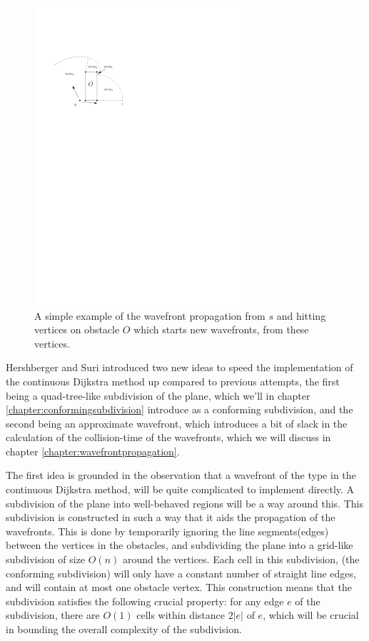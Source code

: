 \begin{figure}[H]
    \centering
	\includegraphics[width=0.7\textwidth]{figures/introductiontowavefront.pdf}
	\caption{A simple example of the wavefront propagation from $s$ and hitting vertices
	         on obstacle $O$ which starts new wavefronts, from these vertices.}
     \label{fig:introductiontowavefront}
\end{figure}

Hershberger and Suri introduced two new ideas to speed the implementation of the
continuous Dijkstra method up compared to previous attempts, the first being a 
quad-tree-like subdivision of the plane, which we'll in chapter \ref{chapter:conformingsubdivision} 
introduce as a conforming subdivision, and the second being an approximate wavefront, which introduces a
bit of slack in the calculation of the collision-time of the wavefronts, which 
we will discuss in chapter \ref{chapter:wavefrontpropagation}.

The first idea is grounded in the observation that a wavefront of the type in the 
continuous Dijkstra method, will be quite complicated to implement directly. 
A subdivision of the plane into well-behaved regions will be a way around this. 
This subdivision is constructed in such a way that it aids the propagation of the 
wavefronts. This is done by temporarily ignoring the line segments(edges) between the 
vertices in the obstacles, and subdividing the plane into a grid-like subdivision of 
size $O(n)$ around the vertices. Each cell in this subdivision, (the conforming 
subdivision) will only have a constant number of straight line edges, and will contain 
at most one obstacle vertex. This construction means that the subdivision satisfies the 
following crucial property: for any edge $e$ of the subdivision, there are $O(1)$ cells 
within distance $2|e|$ of $e$, which will be crucial in bounding the overall complexity
of the subdivision.

